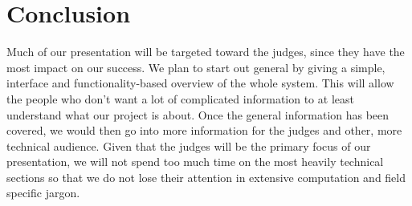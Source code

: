 \section{Conclusion}
Much of our presentation will be targeted toward the judges, since they have the most impact on our success. We plan to start out general by giving a simple, interface and functionality-based overview of the whole system. This will allow the people who don't want a lot of complicated information to at least understand what our project is about. Once the general information has been covered, we would then go into more information for the judges and other, more technical audience. Given that the judges will be the primary focus of our presentation, we will not spend too much time on the most heavily technical sections so that we do not lose their attention in extensive computation and field specific jargon. 